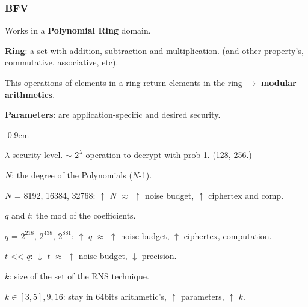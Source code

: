 \documentclass[10pt,handout]{beamer}
\newcommand{\SubItem}[1]{
    {\setlength\itemindent{15pt} \item[-] #1}
}
\begin{document}
\begin{frame}
    \frametitle{BFV}
    Works in a \textbf{Polynomial Ring} domain.

 \vspace{-0.25cm}
\textbf{Ring}: a set with addition, subtraction and multiplication. (and other property's, commutative, associative, etc).

\pause
 \vspace{-0.25cm}
    This operations of elements in a ring return elements in the ring $\rightarrow$  \textbf{modular arithmetics}.

 \vspace{-0.25cm}
\textbf{Parameters}: are application-specific and desired security.

\pause
 \vspace{-0.3cm}
\begin{itemize}\itemsep-0.9em
    \item $\lambda$ security level. $\sim$ $2^\lambda$ operation to decrypt with prob 1. (128, 256.)
    \item $N$: the degree of the Polynomials ($N$-1).
        \SubItem{$N$ = 8192, 16384, 32768: $\uparrow$ $N$ $\approx$ $\uparrow$ noise budget, $\uparrow$ ciphertex and comp.}
\pause
    \item $q$ and $t$: the mod of the coefficients.
        \SubItem{$q$ = $2^{218}$,   $2^{438}$,  $2^{881}$: $\uparrow$ $q$ $\approx$ $\uparrow$ noise budget, $\uparrow$ ciphertex, computation.}
        \SubItem{$t$  << $q$: $\downarrow$ $t$ $\approx$ $\uparrow$ noise budget, $\downarrow$ precision.}
\pause
    \item $k$: size of the set of the RNS technique.
        \SubItem{$k\in [3,5], 9, 16$: stay in 64bits arithmetic's, $\uparrow$ parameters, $\uparrow$ $k$.}
\end{itemize}
\pause
\end{frame}


\end{document}
